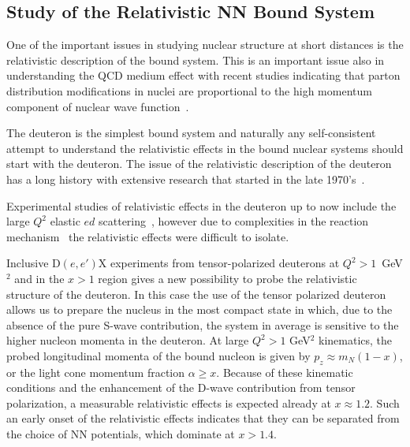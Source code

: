 \subsection{Study of the Relativistic NN Bound System}

One of the important issues in studying nuclear structure  at short distances is the 
relativistic description of the bound system.  This is an important issue also in 
understanding the QCD medium effect with recent studies indicating that  parton distribution 
modifications  in nuclei are proportional to the high momentum component of nuclear wave function~\cite{Weinstein:2010rt}.

The deuteron is the simplest bound system and naturally any self-consistent attempt  to understand the 
relativistic effects in the bound nuclear systems  should start with the deuteron. 
The issue of the relativistic description of the deuteron has a long history with extensive research that started in the late 1970's~\cite{Gross:1982nz,Buck:1979ff,Frankfurt:1977vc,Frankfurt:1981mk}.

Experimental studies of relativistic effects in the deuteron  up to now include the large $Q^2$ elastic 
$ed$ scattering~\cite{Alexa:1998fe}, however  
due to complexities  in the reaction mechanism~\cite{VanOrden:1995eg} the relativistic effects were 
difficult to isolate.

Inclusive D$(e,e')$X experiments from tensor-polarized deuterons at  $Q^2>1$~GeV$^2$ and in the $x>1$ region gives 
a new possibility to probe the relativistic structure of the deuteron.  In this case the use of the tensor polarized
deuteron allows us to prepare the nucleus in the most compact state in which, due to the absence of the 
pure S-wave contribution, the system in average is sensitive to the higher nucleon momenta in the deuteron.
At large $Q^2>1$ GeV$^2$ kinematics, the probed longitudinal momenta of the bound nucleon is given by $p_z \approx m_N(1-x)$, 
or the light cone momentum fraction $\alpha \ge x$. Because of these kinematic conditions and the enhancement of the 
D-wave contribution from tensor polarization, a measurable relativistic effects is expected already at $x\approx 1.2$.  Such an early onset of the relativistic effects indicates that they can be separated from the choice of NN potentials, which dominate at $x>1.4$. 


